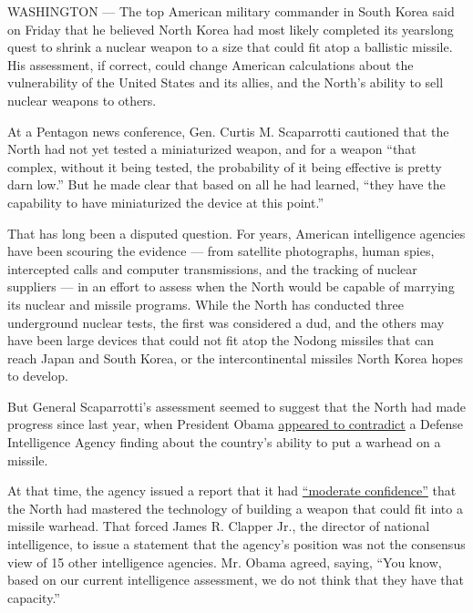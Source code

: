 WASHINGTON --- The top American military commander in South Korea said
on Friday that he believed North Korea had most likely completed its
yearslong quest to shrink a nuclear weapon to a size that could fit atop
a ballistic missile. His assessment, if correct, could change American
calculations about the vulnerability of the United States and its
allies, and the North's ability to sell nuclear weapons to others.

At a Pentagon news conference, Gen. Curtis M. Scaparrotti cautioned that
the North had not yet tested a miniaturized weapon, and for a weapon
``that complex, without it being tested, the probability of it being
effective is pretty darn low.'' But he made clear that based on all he
had learned, ``they have the capability to have miniaturized the device
at this point.''

That has long been a disputed question. For years, American intelligence
agencies have been scouring the evidence --- from satellite photographs,
human spies, intercepted calls and computer transmissions, and the
tracking of nuclear suppliers --- in an effort to assess when the North
would be capable of marrying its nuclear and missile programs. While the
North has conducted three underground nuclear tests, the first was
considered a dud, and the others may have been large devices that could
not fit atop the Nodong missiles that can reach Japan and South Korea,
or the intercontinental missiles North Korea hopes to develop.

But General Scaparrotti's assessment seemed to suggest that the North
had made progress since last year, when President Obama
\href{http://www.nytimes3xbfgragh.onion/2013/04/17/us/politics/obama-voices-doubts-on-north-korean-nuclear-warhead.html?_r=0\&pagewanted=print}{appeared
to contradict} a Defense Intelligence Agency finding about the country's
ability to put a warhead on a missile.

At that time, the agency issued a report that it had
\href{http://www.nytimes3xbfgragh.onion/2013/04/12/world/asia/north-korea-may-have-nuclear-missile-capability-us-agency-says.html?pagewanted=all\&module=Search\&mabReward=relbias\%3As\%2C\%7B\%221\%22\%3A\%22RI\%3A8\%22\%7D}{``moderate
confidence''} that the North had mastered the technology of building a
weapon that could fit into a missile warhead. That forced James R.
Clapper Jr., the director of national intelligence, to issue a statement
that the agency's position was not the consensus view of 15 other
intelligence agencies. Mr. Obama agreed, saying, ``You know, based on
our current intelligence assessment, we do not think that they have that
capacity.''


